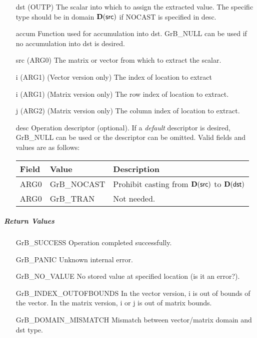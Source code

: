\begin{itemize}[leftmargin=1in]
    \item[{\sf dst}]   ({\sf OUTP}) The scalar into which to assign the extracted value.  The specific type should be in domain $\bold{D}({\sf src})$ if {\sf NOCAST} is specified in {\sf desc}.
    \item[{\sf accum}] Function used for accumulation into dst.  {\sf GrB\_NULL}
                       can be used if no accumulation into dst is desired.
    \item[{\sf src}]   ({\sf ARG0}) The matrix or vector from which to extract the scalar.
    \item[{\sf i}]     ({\sf ARG1}) (Vector version only) The index of location to extract
    \item[{\sf i}]     ({\sf ARG1}) (Matrix version only) The row index of location to extract.
    \item[{\sf j}]     ({\sf ARG2}) (Matrix version only) The column index of location to extract.

    \item[{\sf desc}]   Operation descriptor (optional). If a
    \emph{default} descriptor is desired, {\sf GrB\_NULL} can be
    used or the descriptor can be omitted.  Valid fields and values are as follows: \\
    \begin{tabular}{lll}
    Field  & Value & Description \\
    \hline
    {\sf ARG0} & {\sf GrB\_NOCAST} & Prohibit casting from $\bold{D}({\sf src})$ to $\bold{D}({\sf dst})$ \\
    {\sf ARG0} & {\sf GrB\_TRAN} & Not needed. \\
    \end{tabular}

\end{itemize}


\subparagraph{Return Values}

\begin{itemize}[leftmargin=2.1in]
\item[{\sf GrB\_SUCCESS}]          Operation completed successfully.
\item[{\sf GrB\_PANIC}]            Unknown internal error.
\item[{\sf GrB\_NO\_VALUE}]        No stored value at specified location (is it an error?).
\item[{\sf GrB\_INDEX\_OUTOFBOUNDS}]  In the vector version, {\sf i} is out of 
                                      bounds of the vector.  In the matrix version,
                                      {\sf i} or {\sf j} is out of matrix bounds.
\item[{\sf GrB\_DOMAIN\_MISMATCH}]    Mismatch between vector/matrix domain and {\sf dst} type.
\end{itemize}

